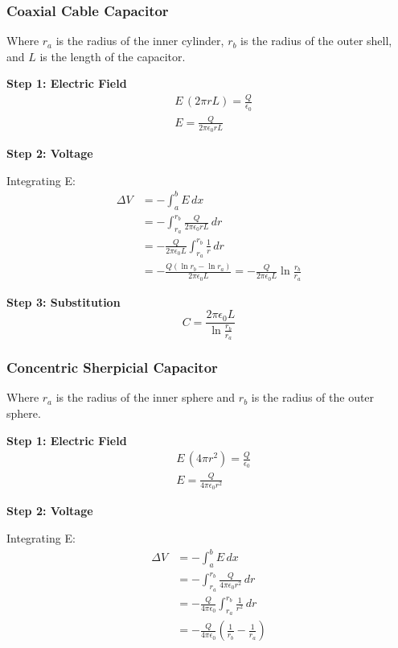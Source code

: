 \documentclass[12pt, titlepage]{article}
\begin{document}
\subsubsection*{Coaxial Cable Capacitor}

Where $r_a$ is the radius of the inner cylinder, $r_b$ is the radius of the outer shell, and $L$ is the length of the capacitor.

\textbf{Step 1: Electric Field}
\begin{align*}
    &E \, (2\pi r L) = \frac{Q}{\epsilon_0} \\
    &E = \frac{Q}{2 \pi \epsilon_0 r L}
\end{align*}

\textbf{Step 2: Voltage}

Integrating E:
\begin{align*}
    \Delta V & = - \int_{a}^{b}E \, dx \\
    &= - \int_{r_a}^{r_b} \frac{Q}{2 \pi \epsilon_0 r L} \, dr\\
    &= - \frac{Q}{2 \pi \epsilon_0 L} \int_{r_a}^{r_b} \frac{1}{r} \, dr\\
    & = - \frac{Q (\ln{r_b}-\ln{r_a})}{2 \pi \epsilon_0 L}
    = - \frac{Q}{2 \pi \epsilon_0 L}\ln{\frac{r_b}{r_a}}
\end{align*}

\textbf{Step 3: Substitution}
\begin{equation*}
    C = \frac{2 \pi \epsilon_0 L}{\ln{\frac{r_b}{r_a}}}
\end{equation*}

\subsubsection*{Concentric Sherpicial Capacitor}

Where $r_a$ is the radius of the inner sphere and $r_b$ is the radius of the outer sphere.

\textbf{Step 1: Electric Field}
\begin{align*}
    &E \, (4\pi r^2) = \frac{Q}{\epsilon_0} \\
    &E = \frac{Q}{4 \pi \epsilon_0 r^2}
\end{align*}

\textbf{Step 2: Voltage}

Integrating E:
\begin{align*}
    \Delta V & = - \int_{a}^{b}E \, dx \\
    &= - \int_{r_a}^{r_b} \frac{Q}{ 4\pi \epsilon_0 r^2} \, dr\\
    &= - \frac{Q}{4 \pi \epsilon_0} \int_{r_a}^{r_b} \frac{1}{r^2} \, dr\\
    & = - \frac{Q}{4 \pi \epsilon_0}(\frac{1}{r_b}-\frac{1}{r_a})
\end{align*}
\end{document}
